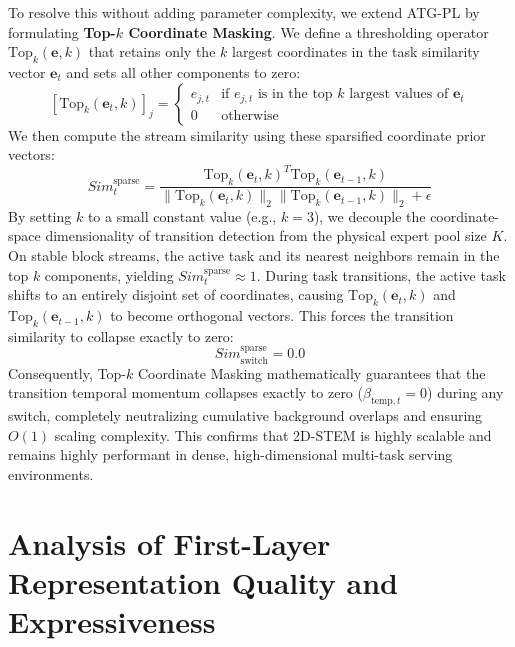 To resolve this without adding parameter complexity, we extend ATG-PL by formulating \textbf{Top-$k$ Coordinate Masking}. We define a thresholding operator $\text{Top}_k(\mathbf{e}, k)$ that retains only the $k$ largest coordinates in the task similarity vector $\mathbf{e}_t$ and sets all other components to zero:
\begin{equation}
    \left[\text{Top}_k\left(\mathbf{e}_t, k\right)\right]_j = \begin{cases} e_{j, t} & \text{if } e_{j, t} \text{ is in the top } k \text{ largest values of } \mathbf{e}_t \\ 0 & \text{otherwise} \end{cases}
\end{equation}
We then compute the stream similarity using these sparsified coordinate prior vectors:
\begin{equation}
    Sim_t^{\text{sparse}} = \frac{\text{Top}_k\left(\mathbf{e}_t, k\right)^T \text{Top}_k\left(\mathbf{e}_{t-1}, k\right)}{\|\text{Top}_k\left(\mathbf{e}_t, k\right)\|_2 \|\text{Top}_k\left(\mathbf{e}_{t-1}, k\right)\|_2 + \epsilon}
\end{equation}
By setting $k$ to a small constant value (e.g., $k=3$), we decouple the coordinate-space dimensionality of transition detection from the physical expert pool size $K$. On stable block streams, the active task and its nearest neighbors remain in the top $k$ components, yielding $Sim_t^{\text{sparse}} \approx 1$. During task transitions, the active task shifts to an entirely disjoint set of coordinates, causing $\text{Top}_k\left(\mathbf{e}_t, k\right)$ and $\text{Top}_k\left(\mathbf{e}_{t-1}, k\right)$ to become orthogonal vectors. This forces the transition similarity to collapse exactly to zero:
\begin{equation}
    Sim_{\text{switch}}^{\text{sparse}} = 0.0
\end{equation}
Consequently, Top-$k$ Coordinate Masking mathematically guarantees that the transition temporal momentum collapses exactly to zero ($\beta_{\text{temp}, t} = 0$) during any switch, completely neutralizing cumulative background overlaps and ensuring $O(1)$ scaling complexity. This confirms that 2D-STEM is highly scalable and remains highly performant in dense, high-dimensional multi-task serving environments.

\section{Analysis of First-Layer Representation Quality and Expressiveness}
\label{sec:first_layer_analysis}

